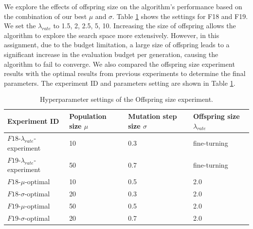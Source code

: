 \documentclass{article}
\begin{document}
We explore the effects of offspring size on the algorithm's performance based on the combination of our best $\mu$ and $\sigma$. Table \ref{tab:al-es-os-hyper} shows the settings for F18 and F19. We set the $\lambda_{rate}$ to 1.5, 2, 2.5, 5, 10. Increasing the size of offspring allows the algorithm to explore the search space more extensively. However, in this assignment, due to the budget limitation, a large size of offspring leads to a significant increase in the evaluation budget per generation, causing the algorithm to fail to converge. We also compared the offspring size experiment results with the optimal results from previous experiments to determine the final parameters. The experiment ID and parameters setting are shown in Table \ref{tab:al-es-os-hyper}.


\begin{table}[!ht]
    \centering
    \caption{Hyperparameter settings of the Offspring size experiment.}
    \label{tab:al-es-os-hyper}
    \begin{tabular}{llll}
       \toprule
       \textbf{Experiment ID} & \textbf{Population size $\mu$} & \textbf{Mutation step size $\sigma$} & \textbf{Offspring size $\lambda_{rate}$}\\
       \midrule
       $F18$-$\lambda_{rate}$-experiment & 10 & 0.3 & fine-turning\\
       $F19$-$\lambda_{rate}$-experiment & 50 & 0.7 & fine-turning\\
       $F18$-$\mu$-optimal & 10 & 0.5 & 2.0\\
       $F18$-$\sigma$-optimal & 20 & 0.3 & 2.0\\
       $F19$-$\mu$-optimal & 50 & 0.5 & 2.0\\
       $F19$-$\sigma$-optimal & 20 & 0.7 & 2.0\\
       
       \bottomrule
    \end{tabular}
\end{table}
\end{document}
